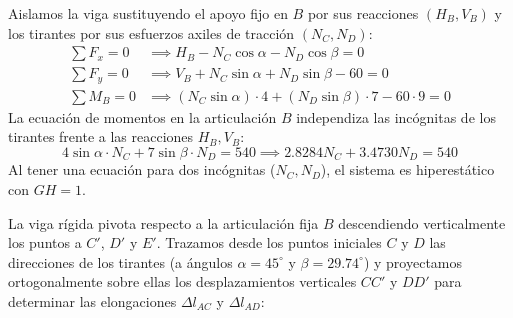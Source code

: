 {    \tcblower


    Aislamos la viga sustituyendo el apoyo fijo en $B$ por sus reacciones $(H_B, V_B)$ y los tirantes por sus esfuerzos axiles de tracción $(N_C, N_D)$:
    \begin{align}
        \sum F_x = 0 & \implies H_B - N_C \cos \alpha - N_D \cos \beta = 0                            \\
        \sum F_y = 0 & \implies V_B + N_C \sin \alpha + N_D \sin \beta - 60 = 0                       \\
        \sum M_B = 0 & \implies (N_C \sin \alpha) \cdot 4 + (N_D \sin \beta) \cdot 7 - 60 \cdot 9 = 0
    \end{align}
    La ecuación de momentos en la articulación $B$ independiza las incógnitas de los tirantes frente a las reacciones $H_B, V_B$:
    \begin{equation}
        4 \sin \alpha \cdot N_C + 7 \sin \beta \cdot N_D = 540 \implies 2.8284 N_C + 3.4730 N_D = 540
    \end{equation}
    Al tener una ecuación para dos incógnitas ($N_C, N_D$), el sistema es hiperestático con $GH = 1$.


    La viga rígida pivota respecto a la articulación fija $B$ descendiendo verticalmente los puntos a $C'$, $D'$ y $E'$.
    Trazamos desde los puntos iniciales $C$ y $D$ las direcciones de los tirantes (a ángulos $\alpha = 45^\circ$ y $\beta = 29.74^\circ$) y proyectamos ortogonalmente sobre ellas los desplazamientos verticales $CC'$ y $DD'$ para determinar las elongaciones $\Delta l_{AC}$ y $\Delta l_{AD}$:

    \begin{center}
\end{center}}
